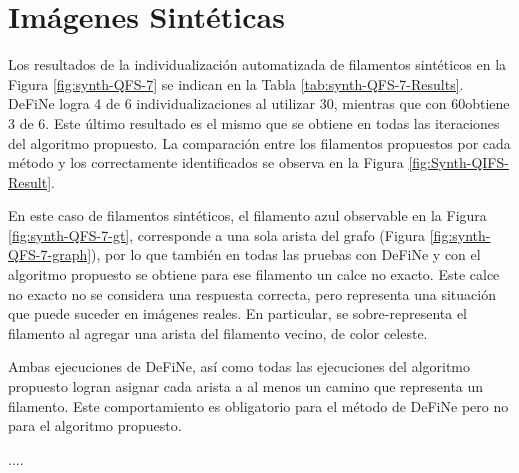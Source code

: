\section{Im\'agenes Sint\'eticas}

Los resultados de la individualizaci\'on automatizada de filamentos sint\'eticos en la Figura \ref{fig:synth-QFS-7} se indican en la Tabla \ref{tab:synth-QFS-7-Results}. DeFiNe logra 4 de 6 individualizaciones al utilizar 30\textdegree, mientras que con 60\textdegree obtiene 3 de 6. Este \'ultimo resultado es el mismo que se obtiene en todas las iteraciones del algoritmo propuesto. La comparaci\'on entre los filamentos propuestos por cada m\'etodo y los correctamente identificados se observa en la Figura \ref{fig:Synth-QIFS-Result}.


En este caso de filamentos sint\'eticos, el filamento azul observable en la Figura \ref{fig:synth-QFS-7-gt}, corresponde a una sola arista del grafo (Figura \ref{fig:synth-QFS-7-graph}), por lo que tambi\'en en todas las pruebas con DeFiNe y con el algoritmo propuesto se obtiene para ese filamento un calce no exacto. Este calce no exacto no se considera una respuesta correcta, pero representa una situaci\'on que puede suceder en im\'agenes reales. En particular, se sobre-representa el filamento al agregar una arista del filamento vecino, de color celeste.


Ambas ejecuciones de DeFiNe, as\'i como todas las ejecuciones del algoritmo propuesto logran asignar cada arista a al menos un camino que representa un filamento. Este comportamiento es obligatorio para el m\'etodo de DeFiNe pero no para el algoritmo propuesto.


....

